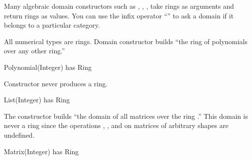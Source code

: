 Many algebraic domain constructors such as ,
, , take rings as
arguments and return rings as values.
You can use the infix operator ``''
to ask a domain if it belongs to a particular category.

\begin{xtc}
\begin{xtccomment}
All numerical types are rings.
Domain constructor  builds ``the ring of polynomials
over any other ring.''
\end{xtccomment}
\begin{spadsrc}
Polynomial(Integer) has Ring
\end{spadsrc}
\begin{TeXOutput}
\begin{fricasmath}{4}
%
\end{fricasmath}
\end{TeXOutput}
\end{xtc}
\begin{xtc}
\begin{xtccomment}
Constructor  never produces a ring.
\end{xtccomment}
\begin{spadsrc}
List(Integer) has Ring
\end{spadsrc}
\begin{TeXOutput}
\begin{fricasmath}{5}
%
\end{fricasmath}
\end{TeXOutput}
\end{xtc}
\begin{xtc}
\begin{xtccomment}
The constructor  builds ``the domain of all matrices
over the ring .'' This domain is never a ring since the operations
\spadSyntax{+}, \spadSyntax{-}, and \spadSyntax{*} on matrices of arbitrary
shapes are undefined.
\end{xtccomment}
\begin{spadsrc}
Matrix(Integer) has Ring
\end{spadsrc}
\begin{TeXOutput}
\begin{fricasmath}{6}
%
\end{fricasmath}
\end{TeXOutput}
\end{xtc}
